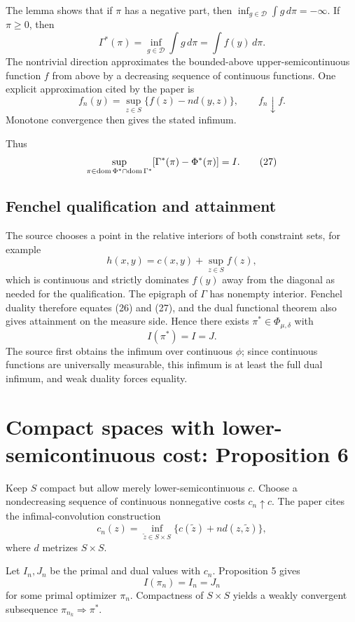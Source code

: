 The lemma shows that if $\pi$ has a negative part, then
$\inf_{g\in\mathcal D}\int g\,d\pi=-\infty$.  If $\pi\ge0$, then
\[
 \Gamma^*(\pi)=\inf_{g\in\mathcal D}\int g\,d\pi
 =\int f(y)\,d\pi.
\]
The nontrivial direction approximates the bounded-above upper-semicontinuous function $f$ from
above by a decreasing sequence of continuous functions.  One explicit approximation cited by the
paper is
\[
 f_n(y)=\sup_{z\in S}\{f(z)-n d(y,z)\},
 \qquad f_n\downarrow f.
\]
Monotone convergence then gives the stated infimum.

Thus
\begin{equation}
 \sup_{\pi\in\operatorname{dom}\Phi^*\cap\operatorname{dom}\Gamma^*}
 [\Gamma^*(\pi)-\Phi^*(\pi)]
 =I. \tag{27}
\end{equation}

\subsection{Fenchel qualification and attainment}
The source chooses a point in the relative interiors of both constraint sets, for example
\[
 h(x,y)=c(x,y)+\sup_{z\in S}f(z),
\]
which is continuous and strictly dominates $f(y)$ away from the diagonal as needed for the
qualification.  The epigraph of $\Gamma$ has nonempty interior.  Fenchel duality therefore equates
(26) and (27), and the dual functional theorem also gives attainment on the measure side.  Hence
there exists $\pi^*\in\Phi_{\mu,\delta}$ with
\[
 I(\pi^*)=I=J.
\]
The source first obtains the infimum over continuous $\phi$; since continuous functions are
universally measurable, this infimum is at least the full dual infimum, and weak duality forces
equality.

\section{Compact spaces with lower-semicontinuous cost: Proposition 6}
Keep $S$ compact but allow merely lower-semicontinuous $c$.  Choose a nondecreasing sequence of
continuous nonnegative costs $c_n\uparrow c$.  The paper cites the infimal-convolution construction
\[
 c_n(z)=\inf_{\tilde z\in S\times S}
       \{c(\tilde z)+n d(z,\tilde z)\},
\]
where $d$ metrizes $S\times S$.

Let $I_n,J_n$ be the primal and dual values with $c_n$.  Proposition 5 gives
\begin{equation}
 I(\pi_n)=I_n=J_n \tag{28}
\end{equation}
for some primal optimizer $\pi_n$.  Compactness of $S\times S$ yields a weakly convergent
subsequence $\pi_{n_k}\Rightarrow\pi^*$.

